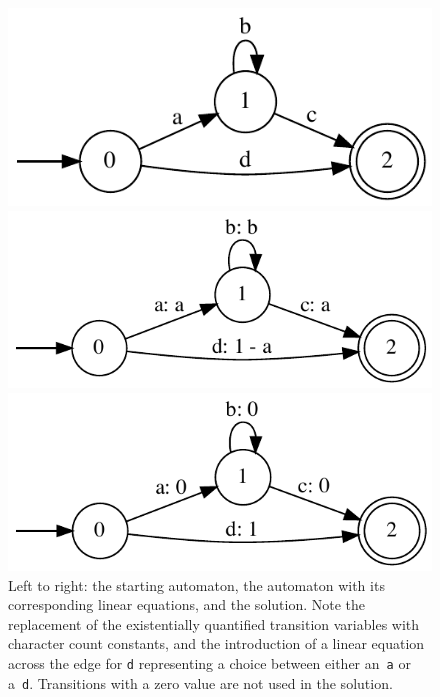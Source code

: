 \documentclass{easychair}
\begin{document}
\begin{figure}[h]
  \caption{Left to right: the starting automaton, the automaton with its corresponding linear equations, and the solution. Note the replacement of the existentially quantified transition variables with character count constants, and the introduction of a linear equation across the edge for \texttt{d} representing a choice between either an~\texttt{a} or a~\texttt{d}. Transitions with a zero value are not used in the solution.}\label{fig:automaton}
  \begin{minipage}[t]{0.3\textwidth}
    \includegraphics[width=\textwidth]{trace-0}
    \end{minipage}
    \begin{minipage}[t]{0.3\textwidth}
    \includegraphics[width=\textwidth]{trace-0-aut-0}
    \end{minipage}
    \begin{minipage}[t]{0.3\textwidth}
      \includegraphics[width=\textwidth]{trace-3-aut-0}
      \end{minipage}
  \end{figure}
\end{document}
